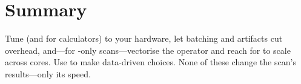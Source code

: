 \section{Summary}
\label{sec:perf-summary}

Tune  (and  for calculators) to your
hardware, let batching and  artifacts cut overhead, and---for -only
scans---vectorise the operator and reach for  to scale across cores.
Use  to make data-driven choices. None of these change the scan's results---only
its speed.
